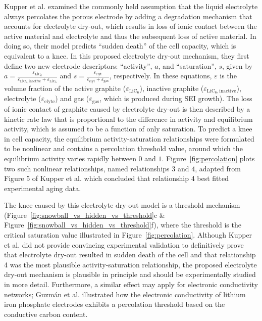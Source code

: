 \documentclass[journal=jpclcd,manuscript=article]{achemso}
\begin{document}
Kupper et al.\cite{kupper_end--life_2018} examined the commonly held assumption that the liquid electrolyte always percolates the porous electrode by adding a degradation mechanism that accounts for electrolyte dry-out, which results in loss of ionic contact between the active material and electrolyte and thus the subsequent loss of active material. In doing so, their model predicts ``sudden death'' of the cell capacity, which is equivalent to a knee. In this proposed electrolyte dry-out mechanism, they first define two new electrode descriptors: ``activity'', $a$, and ``saturation'', $s$, given by $a = \frac{\varepsilon_{\text{LiC}_6}}{\varepsilon_{\text{LiC}_6,\text{inactive}}+\varepsilon_{\text{LiC}_6}}$ and $s = \frac{\varepsilon_\text{elyt}}{\varepsilon_\text{elyt}+\varepsilon_\text{gas}}$, respectively. In these equations, $\varepsilon$ is the volume fraction of the active graphite ($\varepsilon_{\text{LiC}_6}$), inactive graphite ($\varepsilon_{\text{LiC}_6,\text{inactive}}$), electrolyte ($\varepsilon_{\text{elyte}}$) and gas ($\varepsilon_{\text{gas}}$, which is produced during SEI growth). The loss of ionic contact of graphite caused by electrolyte dry-out is then described by a kinetic rate law that is proportional to the difference in activity and equilibrium activity, which is assumed to be a function of only saturation. To predict a knee in cell capacity, the equilibrium activity-saturation relationships were formulated to be nonlinear and contains a percolation threshold value, around which the equilibrium activity varies rapidly between $0$ and $1$. Figure~\ref{fig:percolation} plots two such nonlinear relationships, named relationships $3$ and $4$, adapted from Figure 5 of Kupper et al.\cite{kupper_end--life_2018} which concluded that relationship 4 best fitted experimental aging data.

The knee caused by this electrolyte dry-out model is a threshold mechanism (Figure~\ref{fig:snowball_vs_hidden_vs_threshold}c \& Figure~\ref{fig:snowball_vs_hidden_vs_threshold}f), where the threshold is the critical saturation value illustrated in Figure~\ref{fig:percolation}. Although Kupper et al.\cite{kupper_end--life_2018} did not provide convincing experimental validation to definitively prove that electrolyte dry-out resulted in sudden death of the cell and that relationship 4 was the most plausible activity-saturation relationship, the proposed electrolyte dry-out mechanism is plausible in principle and should be experimentally studied in more detail. Furthermore, a similar effect may apply for electronic conductivity networks; Guzmán et al. \cite{guzman_improved_2017} illustrated how the electronic conductivity of lithium iron phosphate electrodes exhibits a percolation threshold based on the conductive carbon content.
\end{document}
